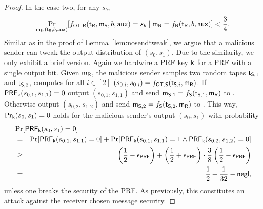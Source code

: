 \begin{proof}
In the case two, for any $s_b$,
$$
\Pr_{\mathsf{m}_{\mathsf{S}}, (\mathsf{t}_{\mathsf{R}},b,\mathsf{aux})}[f_{\mathsf{OT},\mathsf{R}}(\mathsf{t}_{\mathsf{R}},\mathsf{m}_{\mathsf{S}},b,\mathsf{aux})=s_b\mid \mathsf{m}_{\mathsf{R}}=f_{\mathsf{R}}(\mathsf{t}_{\mathsf{R}},b,\mathsf{aux})]<\frac{3}{4}.
$$
Similar as in the proof of Lemma~\ref{lem:nosendtweak}, we argue that a malicious sender can tweak the output distribution of $(s_0,s_1)$. Due to the similarity, we only exhibit a brief version. Again we hardwire a PRF key $\mathsf{k}$ for a PRF with a single output bit. Given $\mathsf{m}_{\mathsf{R}}$, the malicious sender samples two random tapes $\mathsf{t}_{\mathsf{S}, 1}$ and $\mathsf{t}_{\mathsf{S},2}$, computes for all $i\in[2]$ $(s_{0,i},s_{0,i})=f_{\mathsf{OT},\mathsf{S}}(\mathsf{t}_{\mathsf{S},i},\mathsf{m}_{\mathsf{R}})$. If $\mathsf{PRF}_{\mathsf{k}}(s_{0,1},s_{1,1})=0$ output $(s_{0,1},s_{1,1})$ and send $\mathsf{m}_{\mathsf{S},1}=f_{\mathsf{S}}(\mathsf{t}_{\mathsf{S},1},\mathsf{m}_{\mathsf{R}})$ to \rec. Otherwise output $(s_{0,2},s_{1,2})$ and send $\mathsf{m}_{\mathsf{S},2}=f_{\mathsf{S}}(\mathsf{t}_{\mathsf{S},2},\mathsf{m}_{\mathsf{R}})$ to \rec. This way, $\Pr_{\mathsf{k}}(s_0,s_1)=0$ holds for the malicious sender's output $(s_0,s_1)$ with probability 
\begin{eqnarray*}
\lefteqn{\Pr[\PRF_{\key}(s_0,s_1)=0]}\\
&=&\Pr[\PRF_{\key}(s_{0,1},s_{1,1})=0]+\Pr[\PRF_{\key}(s_{0,1},s_{1,1})=1\wedge\PRF_{\key}(s_{0,2},s_{1,2})=0]\\
&\geq&  \left(\frac{1}{2}-\epsilon_{\PRF}\right)+\left(\frac{1}{2}+\epsilon_{\PRF}\right)\cdot\frac{3}{8}\left(\frac{1}{2}-\epsilon_{\PRF}\right)\\
&=& \frac{1}{2}+\frac{1}{32}-\negl,
\end{eqnarray*}
unless one breaks the security of the PRF. As previously, this constitutes an attack against the receiver chosen message security.
\pe
\end{proof}